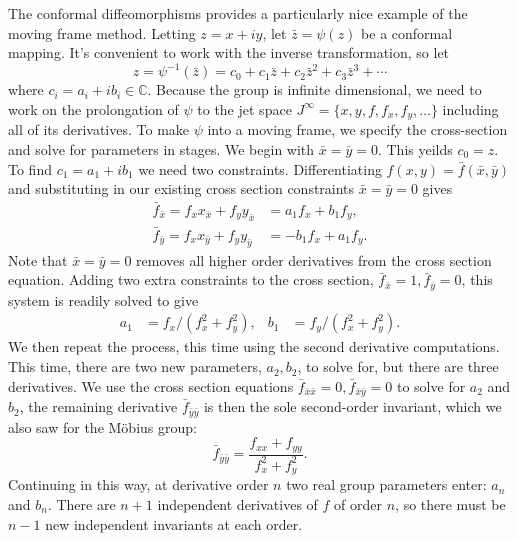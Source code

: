 \documentclass[review,onefignum,onetabnum]{siamonline190516}
\begin{document}
{The conformal diffeomorphisms provides a particularly nice example of the
moving frame method. Letting $z = x + iy$, let $\bar{z} = \psi(z)$ be a conformal
mapping. It's convenient to work with the inverse transformation, so let
\begin{equation*}
    z = \psi^{-1}(\bar{z}) = c_0 + c_1 \bar{z} + c_2 \bar{z}^2 +
    c_3\bar{z}^3 + \cdots
\end{equation*}
where $c_i = a_i + ib_i \in \mathbb{C}$.  Because the group is infinite
dimensional, we need to work on the prolongation of $\psi$ to the jet space
$J^\infty = \{x, y, f, f_x, f_y, \ldots\}$ including all of its
derivatives. To make $\psi$ into a moving frame, we specify the
cross-section and solve for parameters in stages. We begin with $\bar{x} =
\bar{y} = 0$. This yeilds $c_0 = z$. To find $c_1 = a_1 + i b_1$ we need
two constraints. Differentiating $f(x, y) = \bar{f}(\bar{x}, \bar{y})$ and
substituting in our existing cross section constraints $\bar{x} = \bar{y} = 0$ gives
\begin{align*}
    \bar{f}_{\bar{x}} = f_x x_{\bar{x}} + f_y y_{\bar{x}} &= a_1 f_x + b_1
    f_y, \\
    \bar{f}_{\bar{y}} = f_x x_{\bar{y}} + f_y y_{\bar{y}} &= -b_1 f_x + a_1
    f_y. 
\end{align*}
Note that $\bar{x} = \bar{y} = 0$ removes all higher order derivatives from
the cross section equation. Adding two extra constraints to the cross
section, $\bar{f}_{\bar{x}} = 1, \bar{f}_{\bar{y}} = 0$, this system is readily
solved to give 
\begin{equation*}
    \begin{aligned}
        a_1 &= f_x / (f_x^2 + f_y^2), &  b_1 &= f_y / (f_x^2 + f_y^2).
    \end{aligned}
\end{equation*}
We then repeat the process, this time using the second derivative
computations. This time, there are two new parameters, $a_2, b_2$, to solve
for, but there are three derivatives. We use the cross section equations
$\bar{f}_{\bar{x}\bar{x}} = 0, \bar{f}_{\bar{x}\bar{y}} = 0$ to solve for
$a_2$ and $b_2$, the remaining derivative $\bar{f}_{\bar{y}\bar{y}}$ is then the
sole second-order invariant, which we also saw for the M\"obius group: 
\begin{equation*}
    \bar{f}_{\bar{y}\bar{y}} = \frac{f_{xx} + f_{yy}}{f_x^2 + f_y^2}.
\end{equation*}
Continuing in this way, at derivative order $n$ two real group parameters
enter: $a_n$ and $b_n$. There are $n+1$ independent derivatives of $f$ of
order $n$, so there must be $n-1$ new independent invariants at each order.

}
\end{document}
